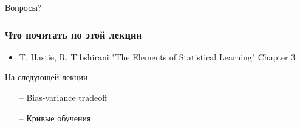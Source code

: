 \documentclass[10pt]{beamer}
\begin{document}
\begin{frame}[standout]
  Вопросы?
\end{frame}

\appendix

\begin{frame}\frametitle{Что почитать по этой лекции}
  \begin{itemize}
    \item T. Hastie, R. Tibshirani "The Elements of Statistical Learning" Chapter 3
  \end{itemize}
\end{frame}

\begin{frame}{На следующей лекции}
	\begin{itemize}
    	\item[--] Bias-variance tradeoff
    	\item[--] Кривые обучения 
	\end{itemize}
\end{frame}
\end{document}
